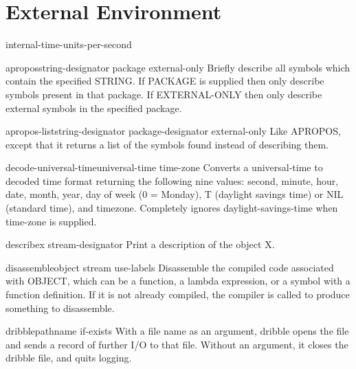 \chapter{External Environment}

\begin{constant}{internal-time-units-per-second}{}{}{}
  
\end{constant}

\begin{function}{apropos}{string-designator \op package external-only}{}{}
  Briefly describe all symbols which contain the specified STRING.
  If PACKAGE is supplied then only describe symbols present in
  that package. If EXTERNAL-ONLY then only describe
  external symbols in the specified package.
\end{function}

\begin{function}{apropos-list}{string-designator \op package-designator external-only}{}{}
  Like APROPOS, except that it returns a list of the symbols found instead
  of describing them.
\end{function}

\begin{function}{decode-universal-time}{universal-time \op time-zone}{}{}
  Converts a universal-time to decoded time format returning the following
   nine values: second, minute, hour, date, month, year, day of week (0 =
   Monday), T (daylight savings time) or NIL (standard time), and timezone.
   Completely ignores daylight-savings-time when time-zone is supplied.
\end{function}

\begin{function}{describe}{x \op stream-designator}{}{}
  Print a description of the object X.
\end{function}

\begin{function}{disassemble}{object \key stream use-labels}{}{}
  Disassemble the compiled code associated with OBJECT, which can be a
  function, a lambda expression, or a symbol with a function definition. If
  it is not already compiled, the compiler is called to produce something to
  disassemble.
\end{function}

\begin{function}{dribble}{\op pathname \key if-exists}{}{}
  With a file name as an argument, dribble opens the file and sends a
  record of further I/O to that file. Without an argument, it closes
  the dribble file, and quits logging.
\end{function}

